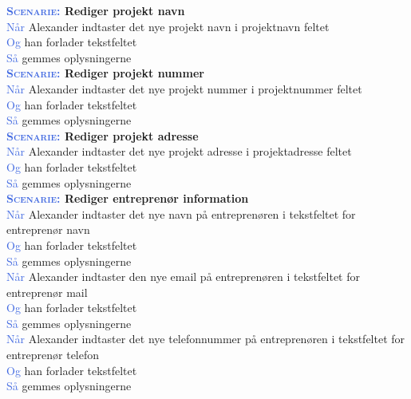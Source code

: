 \textbf{\textsc{\textcolor{RoyalBlue}{Scenarie:}} Rediger projekt navn}\\
\textcolor{RoyalBlue}{Når} Alexander indtaster det nye projekt navn i projektnavn feltet\\
\textcolor{RoyalBlue}{Og} han forlader tekstfeltet\\
\textcolor{RoyalBlue}{Så} gemmes oplysningerne\\

\textbf{\textsc{\textcolor{RoyalBlue}{Scenarie:}} Rediger projekt nummer}\\
\textcolor{RoyalBlue}{Når} Alexander indtaster det nye projekt nummer i projektnummer feltet\\
\textcolor{RoyalBlue}{Og} han forlader tekstfeltet\\
\textcolor{RoyalBlue}{Så} gemmes oplysningerne\\

\textbf{\textsc{\textcolor{RoyalBlue}{Scenarie:}} Rediger projekt adresse}\\
\textcolor{RoyalBlue}{Når} Alexander indtaster det nye projekt adresse i projektadresse feltet\\
\textcolor{RoyalBlue}{Og} han forlader tekstfeltet\\
\textcolor{RoyalBlue}{Så} gemmes oplysningerne\\

\textbf{\textsc{\textcolor{RoyalBlue}{Scenarie:}} Rediger entreprenør information}\\
\textcolor{RoyalBlue}{Når} Alexander indtaster det nye navn på entreprenøren i tekstfeltet for entreprenør navn \\
\textcolor{RoyalBlue}{Og} han forlader tekstfeltet\\
\textcolor{RoyalBlue}{Så} gemmes oplysningerne\\
\textcolor{RoyalBlue}{Når} Alexander indtaster den nye email på entreprenøren i tekstfeltet for entreprenør mail \\
\textcolor{RoyalBlue}{Og} han forlader tekstfeltet\\
\textcolor{RoyalBlue}{Så} gemmes oplysningerne\\
\textcolor{RoyalBlue}{Når} Alexander indtaster det nye telefonnummer på entreprenøren i tekstfeltet for entreprenør telefon \\
\textcolor{RoyalBlue}{Og} han forlader tekstfeltet\\
\textcolor{RoyalBlue}{Så} gemmes oplysningerne\\

